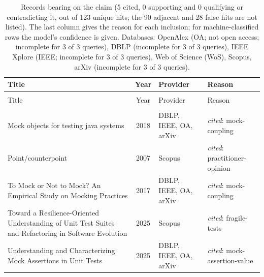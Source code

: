 
\begingroup\footnotesize
\begin{longtable}{@{}%
  >{\raggedright\arraybackslash}p{}c%
  >{\raggedright\arraybackslash}p{}%
  >{\raggedright\arraybackslash}p{}@{}}
\caption{Records bearing on the claim (5 cited, 0 supporting and 0 qualifying or contradicting it, out of 123 unique hits; the 90 adjacent and 28 false hits are not listed). The last column gives the reason for each inclusion; for machine-classified rows the model's confidence is given. Databases: OpenAlex (OA; not open access; incomplete for 3 of 3 queries), DBLP (incomplete for 3 of 3 queries), IEEE Xplore (IEEE; incomplete for 3 of 3 queries), Web of Science (WoS), Scopus, arXiv (incomplete for 3 of 3 queries).}\label{tab:t-interaction-brittle}\\
\toprule
Title & Year & Provider & Reason \\
\midrule
\endfirsthead
\multicolumn{4}{@{}l}{\emph{\tablename~\thetable{} (cont.)}}\\
\toprule
Title & Year & Provider & Reason \\
\midrule
\endhead
\midrule \multicolumn{4}{r@{}}{\emph{continued on next page}}\\
\endfoot
\bottomrule
\endlastfoot
Mock objects for testing java systems & 2018 & DBLP, IEEE, OA, arXiv & \emph{cited}: mock-coupling \\
Point/counterpoint & 2007 & Scopus & \emph{cited}: practitioner-opinion \\
To Mock or Not to Mock? An Empirical Study on Mocking Practices & 2017 & DBLP, IEEE, OA, arXiv & \emph{cited}: mock-coupling \\
Toward a Resilience-Oriented Understanding of Unit Test Suites and Refactoring in Software Evolution & 2025 & Scopus & \emph{cited}: fragile-tests \\
Understanding and Characterizing Mock Assertions in Unit Tests & 2025 & DBLP, IEEE, OA, arXiv & \emph{cited}: mock-assertion-value \\
\end{longtable}
\endgroup
